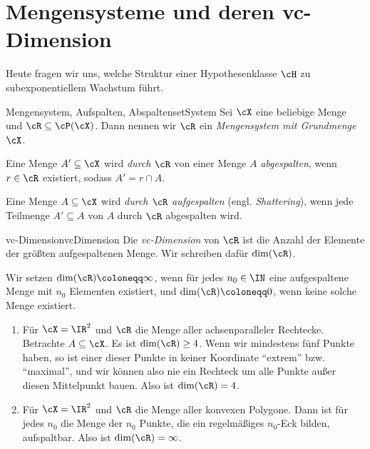 \documentclass[language=ngerman,algolist,acrolist]{TemplateLecture}
\begin{document}


\chapter{Mengensysteme und deren \acs{vc}-Dimension}

Heute fragen wir uns, welche Struktur einer Hypothesenklasse $\cH$ zu subexponentiellem Wachstum führt.

\begin{defi}{Mengensystem, Aufspalten, Abspalten}{setSystem}
    Sei $\cX$ eine beliebige Menge und $\cR \subseteq \cP(\cX)$. Dann nennen wir $\cR$ ein \emph{Mengensystem mit Grundmenge $\cX$}.
    
    Eine Menge $A' \subseteq \cX$ wird \emph{durch $\cR$} von einer Menge $A$ \emph{abgespalten}, wenn $r \in \cR$ existiert, sodass $A' = r \cap A$.

    Eine Menge $A \subseteq \cX$ wird \emph{durch $\cR$ aufgespalten} (engl. \emph{Shattering}), wenn jede Teilmenge $A' \subseteq A$ von $A$ durch $\cR$ abgespalten wird.
\end{defi}

\begin{defi}{\acs{vc}-Dimension}{vcDimension}
    Die \emph{\acf{vc}-Dimension} von $\cR$ ist die Anzahl der Elemente der größten aufgespaltenen Menge. Wir schreiben dafür $\dim(\cR)$.

    Wir setzen $\dim(\cR) \coloneqq \infty$, wenn für jedes $n_0 \in \IN$ eine aufgespaltene Menge mit $n_0$ Elementen existiert, und $\dim(\cR) \coloneqq 0$, wenn keine solche Menge existiert.
\end{defi}

\begin{expl}\leavevmode
    \begin{enumerate}
        \item Für $\cX = \IR^2$ und $\cR$ die Menge aller achsenparalleler Rechtecke. Betrachte $A \subseteq \cX$. Es ist $\dim(\cR) \geq 4$. Wenn wir mindestens fünf Punkte haben, so ist einer dieser Punkte in keiner Koordinate \enquote{extrem} bzw. \enquote{maximal}, und wir können also nie ein Rechteck um alle Punkte außer diesen Mittelpunkt bauen. Also ist $\dim(\cR) = 4$.
        \item Für $\cX = \IR^2$ und $\cR$ die Menge aller konvexen Polygone. Dann ist für jedes $n_0$ die Menge der $n_0$ Punkte, die ein regelmäßiges $n_0$-Eck bilden, aufspaltbar. Also ist $\dim(\cR) = \infty$.
    \end{enumerate}
\end{expl}
\end{document}
